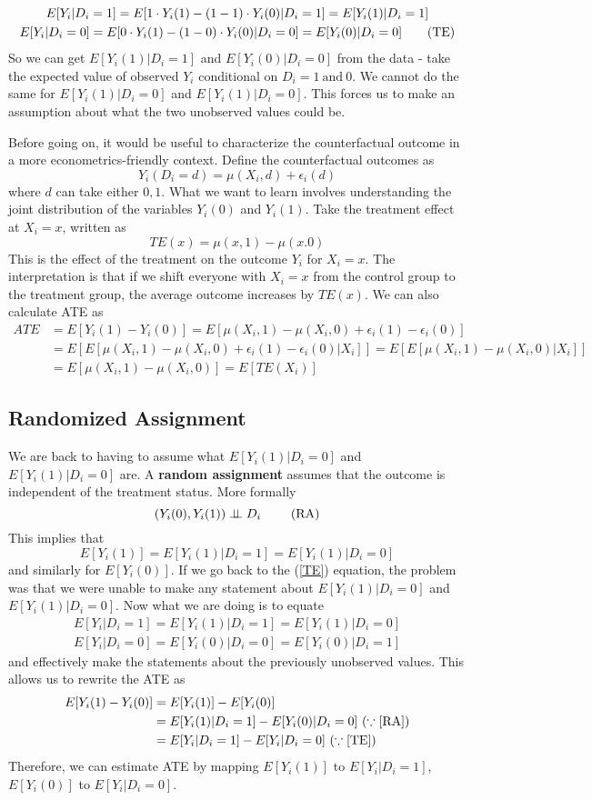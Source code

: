 \documentclass[12pt]{article}
\theoremstyle{definition}
\theoremstyle{property}
\theoremstyle{assumption}
\theoremstyle{example}
\theoremstyle{comment}
\begin{document}
\begin{gather*}
E[Y_i|D_i=1]=E[1\cdot Y_i(1)-(1-1)\cdot Y_i(0)|D_i=1]=E[Y_i(1)|D_i=1]\\
E[Y_i|D_i=0]=E[0\cdot Y_i(1)-(1-0)\cdot Y_i(0)|D_i=0]=E[Y_i(0)|D_i=0] \tag{\text{TE}}\label{TE}
\end{gather*}
So we can get $E[Y_i(1)|D_i=1]$ and $E[Y_i(0)|D_i=0]$ from the data - take the expected value of observed $Y_i$ conditional on $D_i=1 \ \text{and}\ 0$. We cannot do the same for $E[Y_i(1)|D_i=0]$ and $E[Y_i(1)|D_i=0]$. This forces us to make an assumption about what the two unobserved values could be. \par
Before going on, it would be useful to characterize the counterfactual outcome in a more econometrics-friendly context. Define the counterfactual outcomes as
\[
Y_i(D_i=d)=\mu(X_i,d)+\epsilon_i(d)
\]
where $d$ can take either $0, 1$. What we want to learn involves understanding the joint distribution of the variables $Y_i(0)$ and $Y_i(1)$. Take the treatment effect at $X_i=x$, written as
\[
TE(x)=\mu(x,1)-\mu(x.0)
\]
This is the effect of the treatment on the outcome $Y_i$ for $X_i=x$. The interpretation is that if we shift everyone with $X_i=x$ from the control group to the treatment group, the average outcome increases by $TE(x)$. We can also calculate ATE as
\begin{align*}
ATE&=E[Y_i(1)-Y_i(0)]=E[\mu(X_i,1)-\mu(X_i,0)+\epsilon_i(1)-\epsilon_i(0)]\\
&=E\left[E[\mu(X_i,1)-\mu(X_i,0)+\epsilon_i(1)-\epsilon_i(0)|X_i]\right]=E\left[E[\mu(X_i,1)-\mu(X_i,0)|X_i]\right]\\
&=E[\mu(X_i,1)-\mu(X_i,0)]=E[TE(X_i)]
\end{align*}
\subsection{Randomized Assignment}
We are back to having to assume what $E[Y_i(1)|D_i=0]$ and $E[Y_i(1)|D_i=0]$ are. A \textbf{random assignment} assumes that the outcome is independent of the treatment status. More formally
\[
(Y_i(0), Y_i(1))\perp \!\!\! \perp D_i \ \tag{\text{RA}}\label{RA}
\]
This implies that
\[
E[Y_i(1)]=E[Y_i(1)|D_i=1]=E[Y_i(1)|D_i=0]
\]
and similarly for $E[Y_i(0)]$. If we go back to the (\ref{TE}) equation, the problem was that we were unable to make any statement about $E[Y_i(1)|D_i=0]$ and $E[Y_i(1)|D_i=0]$. Now what we are doing is to equate
\begin{gather*}
E[Y_i|D_i=1]=E[Y_i(1)|D_i=1]=E[Y_i(1)|D_i=0]\\
 E[Y_i|D_i=0]=E[Y_i(0)|D_i=0]=E[Y_i(0)|D_i=1]
\end{gather*}
and effectively make the statements about the previously unobserved values. This allows us to rewrite the ATE as 
\begin{align*}
E[Y_i(1)-Y_i(0)]&=E[Y_i(1)]-E[Y_i(0)]\\
&=E[Y_i(1)|D_i=1]-E[Y_i(0)|D_i=0] \ (\because \ref{RA})\\
&=E[Y_i|D_i=1]-E[Y_i|D_i=0] \ (\because \ref{TE})
\end{align*}
Therefore, we can estimate ATE by mapping $E[Y_i(1)]$ to $E[Y_i|D_i=1]$, $E[Y_i(0)]$ to $E[Y_i|D_i=0]$. 
\end{document}
